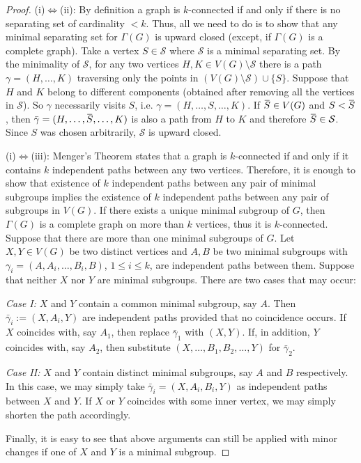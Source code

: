 \documentclass[a4paper,12pt]{article}
\theoremstyle{definition}
\theoremstyle{remark}
\theoremstyle{theorem}
\newcommand{\overbar}[1]{\mkern 1.5mu\overline{\mkern-1.5mu#1\mkern-1.5mu}\mkern 1.5mu}
\begin{document}
\begin{proof}
  (i)\!$\iff$\!(ii): By definition a graph is $k$-connected if and
  only if there is no separating set of cardinality $<k$. Thus, all we
  need to do is to show that any minimal separating set for
  $\Gamma(G)$ is upward closed (except, if $\Gamma(G)$ is a complete
  graph). Take a vertex $S\in\mathcal{S}$ where $\mathcal{S}$ is a
  minimal separating set. By the minimality of $\mathcal{S}$, for any
  two vertices $H,K\in V(G)\setminus\mathcal{S}$ there is a path
  $\gamma=(H,\dots,K)$ traversing only the points in
  $(V(G)\setminus\mathcal{S})\cup\{S\}$. Suppose that $H$ and $K$
  belong to different components (obtained after removing all the
  vertices in $\mathcal{S}$). So $\gamma$ necessarily visits $S$,
  i.e. $\gamma=(H,\dots,S,\dots,K)$. If $\overbar{S}\in V(G)$ and
  $S<\overbar{S}$, then $\bar{\gamma}=(H,\dots,\overbar{S},\dots,K)$
  is also a path from $H$ to $K$ and therefore
  $\overbar{S}\in\mathcal{S}$. Since $S$ was chosen arbitrarily,
  $\mathcal{S}$ is upward closed.

  (i)\!$\iff$\!(iii): Menger's Theorem states that a graph is
  $k$-connected if and only if it contains $k$ independent paths
  between any two vertices. Therefore, it is enough to show that
  existence of $k$ independent paths between any pair of minimal
  subgroups implies the existence of $k$ independent paths between any
  pair of subgroups in $V(G)$. If there exists a unique minimal
  subgroup of $G$, then $\Gamma(G)$ is a complete graph on more than
  $k$ vertices, thus it is $k$-connected. Suppose that there are more
  than one minimal subgroups of $G$. Let $X,Y\in V(G)$ be two distinct
  vertices and $A,B$ be two minimal subgroups with
  $\gamma_i=(A,A_i,\dots,B_i,B)$, $1\leq i\leq k$, are independent
  paths between them. Suppose that neither $X$ nor $Y$ are minimal
  subgroups. There are two cases that may occur:

  \emph{Case I:} $X$ and $Y$ contain a common minimal subgroup, say
  $A$. Then $\bar{\gamma}_i:=(X,A_i,Y)$ are independent paths provided
  that no coincidence occurs. If $X$ coincides with, say $A_1$, then
  replace $\bar{\gamma}_1$ with $(X,Y)$. If, in addition, $Y$
  coincides with, say $A_2$, then substitute
  $(X,\dots,B_1,B_2,\ldots,Y)$ for $\bar{\gamma}_2$.

  \emph{Case II:} $X$ and $Y$ contain distinct minimal subgroups, say
  $A$ and $B$ respectively. In this case, we may simply take
  $\bar{\gamma}_i=(X,A_i,B_i,Y)$ as independent paths between $X$ and
  $Y$. If $X$ or $Y$ coincides with some inner vertex, we may simply
  shorten the path accordingly.

  Finally, it is easy to see that above arguments can still be applied
  with minor changes if one of $X$ and $Y$ is a minimal subgroup.
\end{proof}
\end{document}
